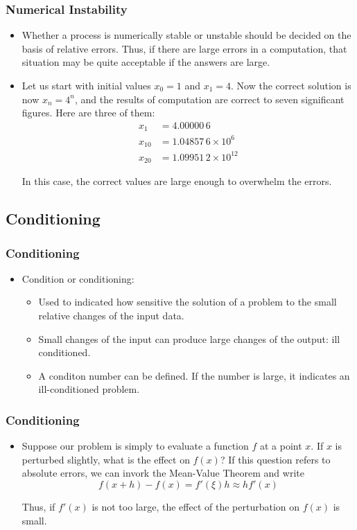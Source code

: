 \documentclass[notheorems,mathserif,table,compress]{beamer}  %
\begin{document}
\begin{frame}
\frametitle{Numerical Instability}
\begin{itemize}
\item Whether a process is numerically stable or unstable should be decided on the basis of relative errors. Thus, if there are large errors in a computation, that situation may be quite acceptable if the answers are large.
\item Let us start with initial values $x_0=1$ and $x_1=4$. Now the correct solution is now $x_n=4^n$, and the results of computation are correct to seven significant figures. Here are three of them:
\begin{equation*}
\begin{split}
x_1&=4.00000\,6\\
x_{10}&=1.04857\,6\times10^6\\
x_{20}&=1.09951\,2\times10^{12}
\end{split}
\end{equation*}

In this case, the correct values are large enough to overwhelm the errors.
\end{itemize}
\end{frame}
 
\subsection{Conditioning}

\begin{frame}
\frametitle{Conditioning}
\begin{itemize}
\item Condition or conditioning:\newline
\begin{itemize}
\item Used to indicated how sensitive the solution of a problem to the small relative changes of the input data.\newline
\item Small changes of the input can produce large changes of the output: ill conditioned.\newline
\item A conditon number can be defined. If the number is large, it indicates an ill-conditioned problem.
\end{itemize}
\end{itemize}
\end{frame}

\begin{frame}
\frametitle{Conditioning}
\begin{itemize}
\item Suppose our problem is simply to evaluate a function $f$ at a point $x$. If $x$ is perturbed slightly, what is the effect on $f(x)$? If this question refers to absolute errors, we can invork the Mean-Value Theorem and write
\begin{displaymath}
f(x+h)-f(x)=f'(\xi)h\approx hf'(x)
\end{displaymath}

Thus, if $f'(x)$ is not too large, the effect of the perturbation on $f(x)$ is small.
\end{itemize}
\end{frame}
\end{document}
